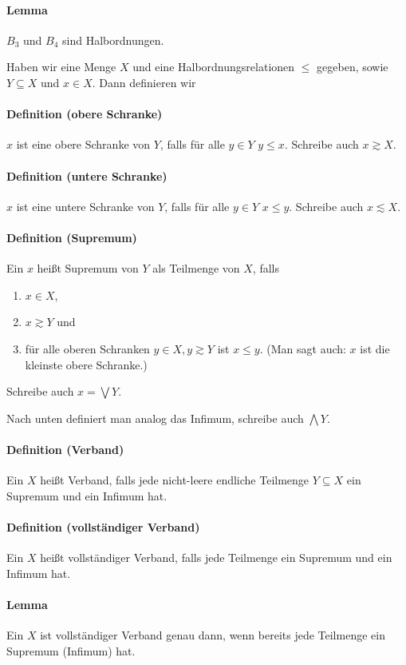 \documentclass[a4paper,11pt,abstracton]{scrartcl}
\begin{document}
\paragraph{Lemma} $B_3$ und $B_4$ sind Halbordnungen.

Haben wir eine Menge $X$ und eine Halbordnungsrelationen $\leq$ gegeben, sowie $Y \subseteq X$ und $x \in X$. Dann definieren wir
\paragraph{Definition (obere Schranke)} $x$ ist eine obere Schranke von $Y$, falls für alle $y \in Y$ $y \leq x$. Schreibe auch $x \gtrsim X$.
\paragraph{Definition (untere Schranke)} $x$ ist eine untere Schranke von $Y$, falls für alle $y \in Y$ $x \leq y$. Schreibe auch $x \lesssim X$.
\paragraph{Definition (Supremum)} Ein $x$ heißt Supremum von $Y$ als Teilmenge von $X$, falls
\begin{enumerate}
 \item $x \in X$,
 \item $x \gtrsim Y$ und
 \item für alle oberen Schranken $y \in X, y \gtrsim Y$ ist $x \leq y$. (Man sagt auch: $x$ ist die kleinste obere Schranke.)
\end{enumerate} Schreibe auch $x = \bigvee Y$.

Nach unten definiert man analog das Infimum, schreibe auch $\bigwedge Y$.

\paragraph{Definition (Verband)} Ein $X$ heißt Verband, falls jede nicht-leere endliche Teilmenge $Y \subseteq X$ ein Supremum und ein Infimum hat.
\paragraph{Definition (vollständiger Verband)} Ein $X$ heißt vollständiger Verband, falls jede Teilmenge ein Supremum und ein Infimum hat.
\paragraph{Lemma} Ein $X$ ist vollständiger Verband genau dann, wenn bereits jede Teilmenge ein Supremum (Infimum) hat.
\end{document}
